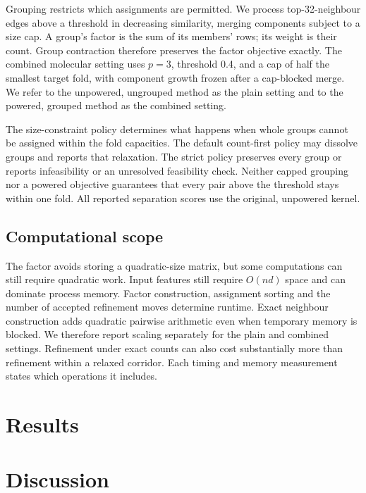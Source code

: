 \documentclass[12pt]{article}
\begin{document}
Grouping restricts which assignments are permitted. We process top-32-neighbour
edges above a threshold in decreasing similarity, merging components subject to
a size cap. A group's factor is the sum of its members' rows; its weight is
their count. Group contraction therefore preserves the factor objective
exactly. The combined molecular setting uses $p=3$, threshold 0.4, and a cap of
half the smallest target fold, with component growth frozen after a cap-blocked
merge. We refer to the unpowered, ungrouped method as the plain setting and to
the powered, grouped method as the combined setting.

The size-constraint policy determines what happens when whole groups cannot be
assigned within the fold capacities. The default count-first policy may
dissolve groups and reports that relaxation. The strict policy preserves every
group or reports infeasibility or an unresolved feasibility check. Neither
capped grouping nor a powered objective guarantees that every pair above the
threshold stays within one fold. All reported separation scores use the
original, unpowered kernel.

\subsection{Computational scope}

The factor avoids storing a quadratic-size matrix, but some computations can
still require quadratic work. Input features still require $O(nd)$ space and
can dominate process memory. Factor construction, assignment sorting and the
number of accepted refinement moves determine runtime. Exact neighbour
construction adds quadratic pairwise arithmetic even when temporary memory is
blocked. We therefore report scaling separately for the plain and combined
settings. Refinement under exact counts can also cost substantially more than
refinement within a relaxed corridor. Each timing and memory measurement states
which operations it includes.

\FloatBarrier
\section{Results}


\FloatBarrier

\section{Discussion}
\end{document}
